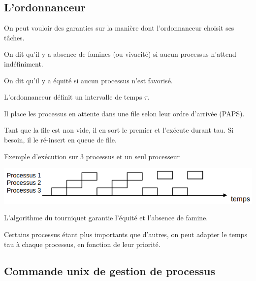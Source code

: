 \subsection{L'ordonnanceur}

On peut vouloir des garanties sur la manière dont l'ordonnanceur choisit ses tâches.

\begin{definition}
	On dit qu'il y a absence de famines (ou vivacité) si aucun processus n'attend indéfiniment.
\end{definition}

\begin{definition}
	On dit qu'il y a équité si aucun processus n'est favorisé.
\end{definition}

\begin{algo}
	L'ordonnanceur définit un intervalle de temps $\tau$. 
	
	Il place les processus en attente dans une file selon leur ordre d'arrivée (PAPS).
	
	Tant que la file est non vide, il en sort le premier et l’exécute durant tau. Si besoin, il le ré-insert en queue de file.
\end{algo}

\begin{example} Exemple d'exécution sur 3 processus et un seul processeur\\
	\begin{center}
		
		\includegraphics[width=0.8\linewidth]{lecon/18-fil/tourniquet.png}
	\end{center}
\end{example}

\begin{proposition}
	L'algorithme du tourniquet garantie l'équité et l'absence de famine.
\end{proposition}

\begin{rem}
	Certains processus étant plus importants que d'autres, on peut adapter le temps tau à chaque processus, en fonction de leur priorité.
\end{rem}

\subsection{Commande unix de gestion de processus}

